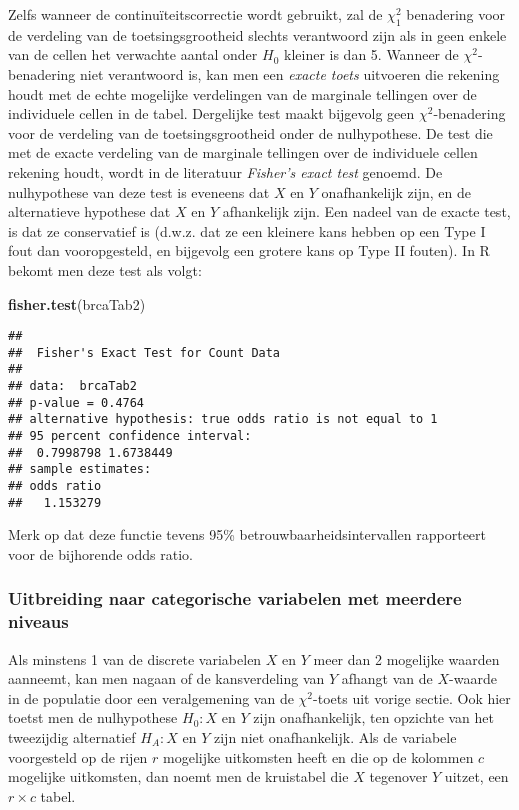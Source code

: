 \documentclass[
  12pt,dutch,coursenotes]{book}
\newenvironment{Shaded}{\begin{snugshade}}{\end{snugshade}}
\newcommand{\KeywordTok}[1]{\textcolor[rgb]{0.13,0.29,0.53}{\textbf{#1}}}
\newcommand{\NormalTok}[1]{#1}
\theoremstyle{definition}
\theoremstyle{definition}
\theoremstyle{definition}
\theoremstyle{remark}
\begin{document}
Zelfs wanneer de continuïteitscorrectie wordt gebruikt, zal de \(\chi^2_1\) benadering voor de verdeling van de toetsingsgrootheid slechts
verantwoord zijn als in geen enkele van de cellen het verwachte aantal onder
\(H_0\) kleiner is dan 5. Wanneer de \(\chi^2\)-benadering niet verantwoord
is, kan men een \emph{exacte toets} uitvoeren die rekening houdt met de
echte mogelijke verdelingen van de marginale tellingen over de individuele
cellen in de tabel. Dergelijke test maakt bijgevolg geen \(\chi^2\)-benadering voor de verdeling van de toetsingsgrootheid onder de
nulhypothese. De test die met de exacte verdeling van de marginale tellingen
over de individuele cellen rekening houdt, wordt in de literatuur \emph{Fisher's exact test} genoemd.
De nulhypothese van deze test is eveneens dat \(X\) en \(Y\) onafhankelijk zijn, en de alternatieve hypothese dat \(X\) en \(Y\)
afhankelijk zijn. Een nadeel van de exacte test, is dat ze conservatief
is (d.w.z. dat ze een kleinere kans hebben op een Type I fout dan
vooropgesteld, en bijgevolg een grotere kans op Type II fouten). In R bekomt men deze test als volgt:

\begin{Shaded}
\begin{Highlighting}[]
\KeywordTok{fisher.test}\NormalTok{(brcaTab2)}
\end{Highlighting}
\end{Shaded}

\begin{verbatim}
## 
##  Fisher's Exact Test for Count Data
## 
## data:  brcaTab2
## p-value = 0.4764
## alternative hypothesis: true odds ratio is not equal to 1
## 95 percent confidence interval:
##  0.7998798 1.6738449
## sample estimates:
## odds ratio 
##   1.153279
\end{verbatim}

Merk op dat deze functie tevens 95\% betrouwbaarheidsintervallen rapporteert voor de bijhorende odds ratio.

\hypertarget{uitbreiding-naar-categorische-variabelen-met-meerdere-niveaus}{%
\subsubsection{Uitbreiding naar categorische variabelen met meerdere niveaus}\label{uitbreiding-naar-categorische-variabelen-met-meerdere-niveaus}}

Als minstens 1 van de discrete variabelen \(X\) en \(Y\) meer dan 2 mogelijke
waarden aanneemt, kan men nagaan of de kansverdeling van \(Y\) afhangt van de \(X\)-waarde in de populatie door een veralgemening van de \(\chi^2\)-toets
uit vorige sectie. Ook hier toetst men de nulhypothese \(H_0: X\) en \(Y\) zijn
onafhankelijk, ten opzichte van het tweezijdig alternatief \(H_A: X\) en \(Y\)
zijn niet onafhankelijk. Als de variabele voorgesteld op de rijen \(r\)
mogelijke uitkomsten heeft en die op de kolommen \(c\) mogelijke uitkomsten,
dan noemt men de kruistabel die \(X\) tegenover \(Y\) uitzet, een \(r \times c\)
tabel.
\end{document}
